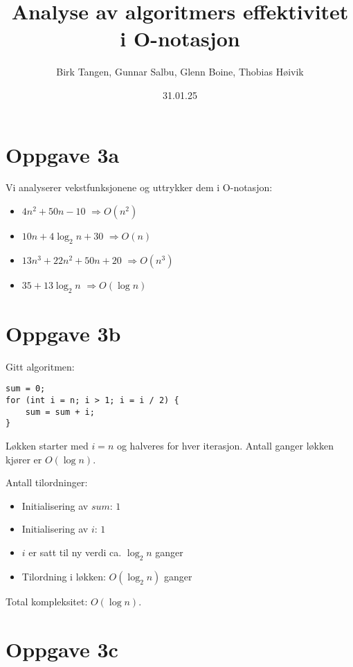 \documentclass{article}
\begin{document}
\title{Analyse av algoritmers effektivitet i O-notasjon}
\author{Birk Tangen, Gunnar Salbu, Glenn Boine, Thobias Høivik}
\date{31.01.25}
\maketitle

\section*{Oppgave 3a}

Vi analyserer vekstfunksjonene og uttrykker dem i O-notasjon:

\begin{itemize}
\item $4n^2 + 50n - 10$ \quad $\Rightarrow O(n^2)$
\item $10n + 4 \log_2 n + 30$ \quad $\Rightarrow O(n)$
\item $13n^3 + 22n^2 + 50n + 20$ \quad $\Rightarrow O(n^3)$
\item $35 + 13 \log_2 n$ \quad $\Rightarrow O(\log n)$
\end{itemize}

\section*{Oppgave 3b}

Gitt algoritmen:

\begin{verbatim}
sum = 0;
for (int i = n; i > 1; i = i / 2) {
    sum = sum + i;
}
\end{verbatim}

Løkken starter med $i = n$ og halveres for hver iterasjon. Antall ganger løkken kjører er $O(\log n)$.

Antall tilordninger:
\begin{itemize}
\item Initialisering av $sum$: $1$
\item Initialisering av $i$: $1$
\item $i$ er satt til ny verdi ca. $\log_2 n$ ganger
\item Tilordning i løkken: $O(\log_2 n)$ ganger
\end{itemize}

Total kompleksitet: $O(\log n)$.

\section*{Oppgave 3c}
\end{document}

